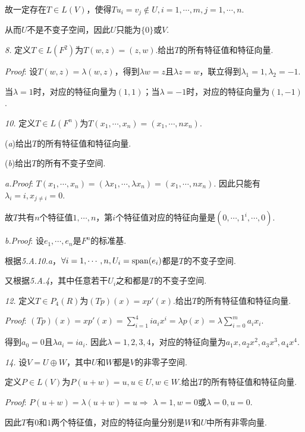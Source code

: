 故一定存在$T \in L(V)$，使得$Tu_i=v_j \notin U,i=1,\cdots,m,j=1,\cdots,n$.

从而$U$不是不变子空间，因此$U$只能为$\{0\}$或$V$.

\hspace*{\fill}

\textit{8.}
定义$T \in L(F^2)$为$T(w,z)=(z,w)$.给出$T$的所有特征值和特征向量.

\textit{Proof}:
设$T(w,z)=\lambda(w,z)$，得到$\lambda w=z$且$\lambda z=w$，联立得到$\lambda_1=1,\lambda_2=-1$.

当$\lambda=1$时，对应的特征向量为$(1,1)$；当$\lambda=-1$时，对应的特征向量为$(1,-1)$.

\newpage

\textit{10.}
定义$T \in L(F^n)$为$T(x_1,\cdots,x_n)=(x_1,\cdots,nx_n)$.

(\textit{a})给出$T$的所有特征值和特征向量.

(\textit{b})给出$T$的所有不变子空间.

\textit{a.Proof}:
$T(x_1,\cdots,x_n)=(\lambda x_1,\cdots,\lambda x_n)=(x_1,\cdots,nx_n)$.
因此只能有$\lambda_i=i,x_{j \ne i}=0$.

故$T$共有$n$个特征值$1,\cdots,n$，第$i$个特征值对应的特征向量是$(0,\cdots,1^i,\cdots,0)$.

\textit{b.Proof}:
设$e_1,\cdots,e_n$是$F^n$的标准基.

根据\textit{5.A.10.a}，$\forall i=1,\cdots,n,U_i=\mathrm{span} (e_i)$都是$T$的不变子空间.

又根据\textit{5.A.4}，其中任意若干$U_i$之和都是$T$的不变子空间.

\hspace*{\fill}

\textit{12.}
定义$T \in P_4(R)$为$(Tp)(x)=xp'(x)$.给出$T$的所有特征值和特征向量.

\textit{Proof}:
$(Tp)(x)=xp'(x)=\sum_{i=1}^4 ia_ix^i=\lambda p(x)=\lambda \sum_{i=0}^m a_ix_i$.

得到$a_0=0$且$\lambda a_i=i a_i$.
因此$\lambda=1,2,3,4$，对应的特征向量为$a_1x,a_2x^2,a_3x^3,a_4x^4$.

\hspace*{\fill}

\textit{14.}
设$V=U \oplus W$，其中$U$和$W$都是$V$的非零子空间.

定义$P \in L(V)$为$P(u+w)=u,u \in U,w \in W$.给出$T$的所有特征值和特征向量.

\textit{Proof}:
$P(u+w)=\lambda(u+w)=u \Rightarrow$ $\lambda=1,w=0$或$\lambda=0,u=0$.

因此$T$有$0$和$1$两个特征值，对应的特征向量分别是$W$和$U$中所有非零向量.

